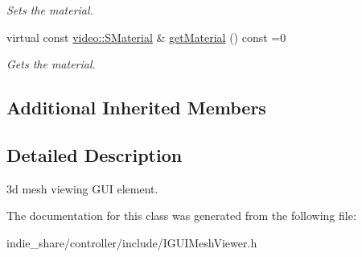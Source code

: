 \begin{DoxyCompactItemize}
\begin{DoxyCompactList}\small\item\em Sets the material. \end{DoxyCompactList}\item 
\mbox{\label{classirr_1_1gui_1_1IGUIMeshViewer_a22fefc9c5255e1896c16e72edb7cd373}} 
virtual const \hyperlink{classirr_1_1video_1_1SMaterial}{video\+::\+S\+Material} \& \hyperlink{classirr_1_1gui_1_1IGUIMeshViewer_a22fefc9c5255e1896c16e72edb7cd373}{get\+Material} () const =0
\begin{DoxyCompactList}\small\item\em Gets the material. \end{DoxyCompactList}\end{DoxyCompactItemize}
\subsection*{Additional Inherited Members}


\subsection{Detailed Description}
3d mesh viewing G\+UI element. 

The documentation for this class was generated from the following file\+:\begin{DoxyCompactItemize}
\item 
indie\+\_\+share/controller/include/I\+G\+U\+I\+Mesh\+Viewer.\+h\end{DoxyCompactItemize}
